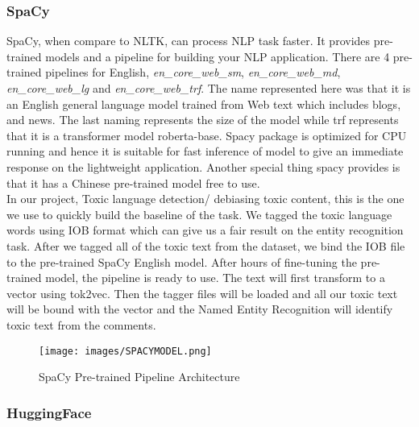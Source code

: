\documentclass[a4paper, 11pt]{article}
\begin{document}
\subsubsection{SpaCy}

SpaCy\cite{spacy2}, when compare to NLTK, can process NLP task faster. It provides pre-trained models and a pipeline for building your NLP application. There are 4 pre-trained pipelines for English, \textit{en\_core\_web\_sm}, \textit{en\_core\_web\_md}, \textit{en\_core\_web\_lg} and \textit{en\_core\_web\_trf}. The name represented here was that it is an English general language model trained from Web text which includes blogs, and news. The last naming represents the size of the model while trf represents that it is a transformer model roberta-base. Spacy package is optimized for CPU running and hence it is suitable for fast inference of model to give an immediate response on the lightweight application. Another special thing spacy provides is that it has a Chinese pre-trained model free to use.\\

In our project, Toxic language detection/ debiasing toxic content, this is the one we use to quickly build the baseline of the task. We tagged the toxic language words using IOB\cite{DBLP:journals/corr/cmp-lg-9505040} format which can give us a fair result on the entity recognition task. After we tagged all of the toxic text from the dataset, we bind the IOB file to the pre-trained SpaCy English model. After hours of fine-tuning the pre-trained model, the pipeline is ready to use. The text will first transform to a vector using tok2vec. Then the tagger files will be loaded and all our toxic text will be bound with the vector and the Named Entity Recognition will identify toxic text from the comments.

\begin{figure}[h]
    \centering
    \texttt{[image: images/SPACYMODEL.png]}
    \caption{SpaCy\cite{spacy2} Pre-trained Pipeline Architecture}
    \label{fig:mesh1}
\end{figure}

\subsubsection{HuggingFace}
\end{document}
